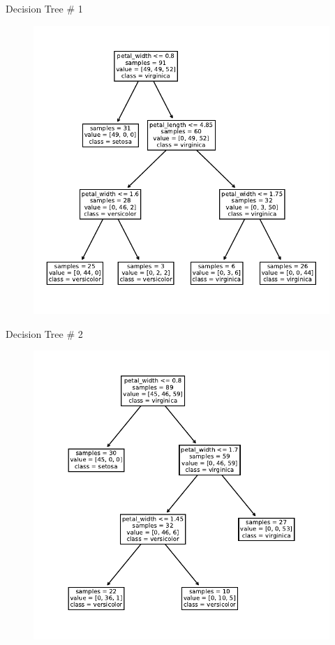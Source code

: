 \documentclass{beamer}
\begin{document}
\begin{frame}{Decision Tree \# 1}
\begin{figure}
\includegraphics[scale=0.7]{tree-1.pdf}
\end{figure}
\end{frame}


\begin{frame}{Decision Tree \# 2}
\begin{figure}
\includegraphics[scale=0.7]{tree-2.pdf}
\end{figure}
\end{frame}
\end{document}

